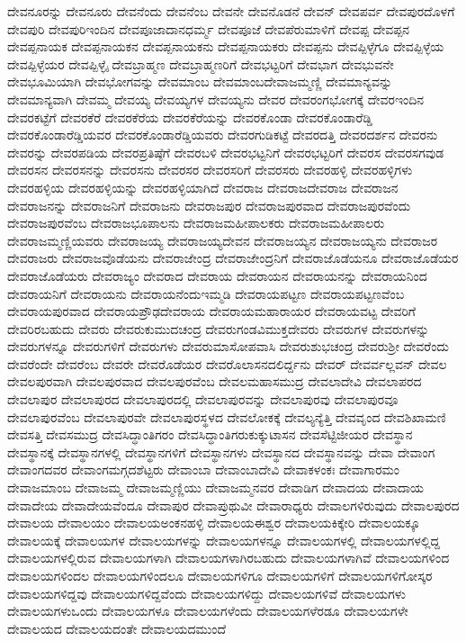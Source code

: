 {ದೇವನೂರನ್ನು
ದೇವನೂರು
ದೇವನೆಂದು
ದೇವನೆಂಬ
ದೇವನೇ
ದೇವನೊಡನೆ
ದೇವನ್
ದೇವಪರ್ವ
ದೇವಪುರದೊಳಗೆ
ದೇವಪುರಿ
ದೇವಪುರಿಇಂದಿನ
ದೇವಪೂಜಾದಾನಧರ್ಮ್ಮ
ದೇವಪೂಜೆ
ದೇವಪೆರುಮಾಳಿಗೆ
ದೇವಪ್ಪ
ದೇವಪ್ಪನ
ದೇವಪ್ಪನಾಯಕ
ದೇವಪ್ಪನಾಯಕನ
ದೇವಪ್ಪನಾಯಕನು
ದೇವಪ್ಪನಾಯಕರು
ದೇವಪ್ಪನು
ದೇವಪ್ಪಿಳ್ಳೆಗೂ
ದೇವಪ್ಪಿಳ್ಳೆಯ
ದೇವಪ್ಪಿಳ್ಳೆಯರ
ದೇವಪ್ಪಿಳ್ಳೈ
ದೇವಬ್ರಾಹ್ಮಣ
ದೇವಬ್ರಾಹ್ಮಣರಿಗೆ
ದೇವಭಟ್ಟರಿಗೆ
ದೇವಭಾಗ
ದೇವಭುವನೇ
ದೇವಭೂಮಿಯಾಗಿ
ದೇವಭೋಗವನ್ನು
ದೇವಮಾಂಬ
ದೇವಮಾಂಬದೇವಾಜಮ್ಮಣ್ಣಿ
ದೇವಮಾನ್ಯವನ್ನು
ದೇವಮಾನ್ಯವಾಗಿ
ದೇವಮ್ಮ
ದೇವಯ್ಯ
ದೇವಯ್ಯಗಳ
ದೇವಯ್ಯನು
ದೇವರ
ದೇವರಂಗಭೋಗಕ್ಕೆ
ದೇವರಇಂದಿನ
ದೇವರಕಟ್ಟೆಗೆ
ದೇವರಕೆರೆ
ದೇವರಕೆರೆಯ
ದೇವರಕೆರೆಯನ್ನು
ದೇವರಕೊಂಡಾ
ದೇವರಕೊಂಡಾರೆಡ್ಡಿ
ದೇವರಕೊಂಡಾರೆಡ್ಡಿಯವರ
ದೇವರಕೊಂಡಾರೆಡ್ಡಿಯವರು
ದೇವರಗುಡಿಕಟ್ಟೆ
ದೇವರದತ್ತಿ
ದೇವರದರ್ಶನ
ದೇವರನು
ದೇವರನ್ನು
ದೇವರಪಡಿಯ
ದೇವರಪ್ರತಿಷ್ಠೆಗೆ
ದೇವರಬಳಿ
ದೇವರಭಟ್ಟನಿಗೆ
ದೇವರಭಟ್ಟರಿಗೆ
ದೇವರಸ
ದೇವರಸಗವುಡ
ದೇವರಸನ
ದೇವರಸನನ್ನು
ದೇವರಸನು
ದೇವರಸರ
ದೇವರಸರಿಗೆ
ದೇವರಸರು
ದೇವರಹಳ್ಳಿ
ದೇವರಹಳ್ಳಿಗಳು
ದೇವರಹಳ್ಳಿಯ
ದೇವರಹಳ್ಳಿಯನ್ನು
ದೇವರಹಳ್ಳಿಯಾಗಿದೆ
ದೇವರಾಜ
ದೇವರಾಜದೇವರಾಜ
ದೇವರಾಜನ
ದೇವರಾಜನನ್ನು
ದೇವರಾಜನಿಗೆ
ದೇವರಾಜನು
ದೇವರಾಜಪುರ
ದೇವರಾಜಪುರವಾದ
ದೇವರಾಜಪುರವೆಂದು
ದೇವರಾಜಪುರವೆಂಬ
ದೇವರಾಜಭೂಪಾಲನು
ದೇವರಾಜಮಹೀಪಾಲಕರು
ದೇವರಾಜಮಹೀಪಾಲರು
ದೇವರಾಜಮ್ಮಣ್ಣಿಯವರು
ದೇವರಾಜಯ್ಯ
ದೇವರಾಜಯ್ಯದೇವನ
ದೇವರಾಜಯ್ಯನ
ದೇವರಾಜಯ್ಯನು
ದೇವರಾಜರ
ದೇವರಾಜರು
ದೇವರಾಜವೊಡೆಯನು
ದೇವರಾಜೇಂದ್ರ
ದೇವರಾಜೇಂದ್ರನಿಗೆ
ದೇವರಾಜೊಡೆಯನೂ
ದೇವರಾಜೊಡೆಯರ
ದೇವರಾಜೊಡೆಯರು
ದೇವರಾಜ್ಯಂ
ದೇವರಾದ
ದೇವರಾಯ
ದೇವರಾಯನ
ದೇವರಾಯನನ್ನು
ದೇವರಾಯನಿಂದ
ದೇವರಾಯನಿಗೆ
ದೇವರಾಯನು
ದೇವರಾಯನೆಂದುಇಮ್ಮಡಿ
ದೇವರಾಯಪಟ್ಟಣ
ದೇವರಾಯಪಟ್ಟಣವೆಂಬ
ದೇವರಾಯಪುರವಾದ
ದೇವರಾಯಪ್ರೌಢದೇವರಾಯ
ದೇವರಾಯಮಹಾರಾಯರ
ದೇವರಾಯವಟ್ಟ
ದೇವರಿಗೆ
ದೇವರಿರಬಹುದು
ದೇವರು
ದೇವರುಕುಮುದಚಂದ್ರ
ದೇವರುಗಂಡವಿಮುಕ್ತದೇವರು
ದೇವರುಗಳ
ದೇವರುಗಳನ್ನು
ದೇವರುಗಳನ್ನೂ
ದೇವರುಗಳಿಗೆ
ದೇವರುಗಳು
ದೇವರುಮಾಸೋಪವಾಸಿ
ದೇವರುಶುಭಚಂದ್ರ
ದೇವರುಶ್ರೀ
ದೇವರೆಂದು
ದೇವರೆಂದೇ
ದೇವರೆಂಬ
ದೇವರೇ
ದೇವರೊಡೆಯರ
ದೇವರೊಲಾಸನದಲಿರ್ದ್ದನು
ದೇವರ್
ದೇವರ್ವಲ್ಲವನ್
ದೇವಲ
ದೇವಲಪುರವಾಗಿ
ದೇವಲಪುರವಾದ
ದೇವಲಪುರವೆಂಬ
ದೇವಲಮಹಾಸಮುದ್ರ
ದೇವಲಾದೇವಿ
ದೇವಲಾಪರದ
ದೇವಲಾಪುರ
ದೇವಲಾಪುರದ
ದೇವಲಾಪುರದಲ್ಲಿ
ದೇವಲಾಪುರವನ್ನು
ದೇವಲಾಪುರವು
ದೇವಲಾಪುರವೂ
ದೇವಲಾಪುರವೆಂಬ
ದೇವಲಾಪುರವೇ
ದೇವಲಾಪುರಸ್ಥಳದ
ದೇವಲೋಕಕ್ಕೆ
ದೇವಲ್ಯನ್ಯೆತ್ತಿ
ದೇವವೃಂದ
ದೇವಶಿಖಾಮಣಿ
ದೇವಸತ್ತಿ
ದೇವಸಮುದ್ರ
ದೇವಸಿದ್ಧಾಂತಿಗರಂ
ದೇವಸಿದ್ಧಾಂತಿಗರುಕುಕ್ಕುಟಾಸನ
ದೇವಸೆಟ್ಟಿಜೀಯರ
ದೇವಸ್ಥಾನ
ದೇವಸ್ಥಾನಕ್ಕೆ
ದೇವಸ್ಥಾನಗಳಲ್ಲಿ
ದೇವಸ್ಥಾನಗಳಿಗೆ
ದೇವಸ್ಥಾನಗಳು
ದೇವಸ್ಥಾನದ
ದೇವಸ್ಥಾನವನ್ನು
ದೇವಾ
ದೇವಾಂಗ
ದೇವಾಂಗದವರ
ದೇವಾಂಗಮಗ್ಗದಶೆಟ್ಟರು
ದೇವಾಂಬಾ
ದೇವಾಂಬಾದೇವಿ
ದೇವಾಕಳಂಕಃ
ದೇವಾಗಾರಮಂ
ದೇವಾಜಮಾಂಬ
ದೇವಾಜಮ್ಮ
ದೇವಾಜಮ್ಮಣ್ಣಿಯು
ದೇವಾಜಮ್ಮನವರ
ದೇವಾಡಿಗ
ದೇವಾದಯ
ದೇವಾದಾಯ
ದೇವಾದೇಯ
ದೇವಾದೇಯವೆಂದೂ
ದೇವಾಪುರ
ದೇವಾಪ್ರುಥುವೀ
ದೇವಾರಾಧ್ಯರು
ದೇವಾಲಗಳಿರುವುದು
ದೇವಾಲಪುರದ
ದೇವಾಲಯ
ದೇವಾಲಯಂ
ದೇವಾಲಯಅಂಕನಹಳ್ಳಿ
ದೇವಾಲಯಈಶ್ವರ
ದೇವಾಲಯಕಿಕ್ಕೇರಿ
ದೇವಾಲಯಕ್ಕೂ
ದೇವಾಲಯಕ್ಕೆ
ದೇವಾಲಯಗಳ
ದೇವಾಲಯಗಳನ್ನು
ದೇವಾಲಯಗಳನ್ನೂ
ದೇವಾಲಯಗಳಲ್ಲಿ
ದೇವಾಲಯಗಳಲ್ಲಿದ್ದ
ದೇವಾಲಯಗಳಲ್ಲಿರುವ
ದೇವಾಲಯಗಳಾಗಿ
ದೇವಾಲಯಗಳಾಗಿರಬಹುದು
ದೇವಾಲಯಗಳಾಗಿವೆ
ದೇವಾಲಯಗಳಿಂದ
ದೇವಾಲಯಗಳಿಂದಲ
ದೇವಾಲಯಗಳಿಂದಲೂ
ದೇವಾಲಯಗಳಿಗೂ
ದೇವಾಲಯಗಳಿಗೆ
ದೇವಾಲಯಗಳಿಗೋಸ್ಕರ
ದೇವಾಲಯಗಳಿದ್ದವು
ದೇವಾಲಯಗಳಿದ್ದವೆಂದು
ದೇವಾಲಯಗಳಿದ್ದು
ದೇವಾಲಯಗಳಿವೆ
ದೇವಾಲಯಗಳು
ದೇವಾಲಯಗಳುಒಂದು
ದೇವಾಲಯಗಳೂ
ದೇವಾಲಯಗಳೆಂದು
ದೇವಾಲಯಗಳೆರಡೂ
ದೇವಾಲಯಗಳೇ
ದೇವಾಲಯದ
ದೇವಾಲಯದಂತೇ
ದೇವಾಲಯದಮುಂದೆ
}
